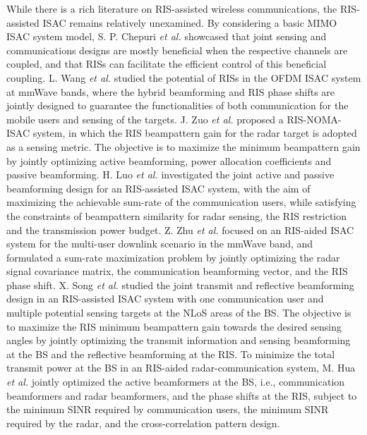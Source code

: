 \documentclass[journal,comsoc]{IEEEtran}
\begin{document}
While there is a rich literature on RIS-assisted wireless communications, the RIS-assisted ISAC remains relatively unexamined. By considering a basic MIMO ISAC system model, S. P. Chepuri \emph{et al.} \cite{ISAC-RIS-2022} showcased that joint sensing and communications designs are mostly beneficial when the respective channels are coupled, and that RISs can facilitate the efficient control of this beneficial coupling. L. Wang \emph{et al.} \cite{JCAS-RIS-mmWave-2022} studied the potential of RISs in the OFDM ISAC system at mmWave bands, where the hybrid beamforming and RIS phase shifts are jointly designed to guarantee the functionalities of both communication for the mobile users and sensing of the targets. J. Zuo \emph{et al.} \cite{NOMA-RIS-ISAC-2022} proposed a RIS-NOMA-ISAC system, in which the RIS beampattern gain for the radar target is adopted as a sensing metric. The objective is to maximize the minimum beampattern gain by jointly optimizing active beamforming, power allocation coefficients and passive beamforming. H. Luo \emph{et al.} \cite{Joint-Beamforming-Design-RIS-ISAC} investigated the joint active and passive beamforming design for an RIS-assisted ISAC system, with the aim of maximizing the achievable sum-rate of the communication users, while satisfying the constraints of beampattern similarity for radar sensing, the RIS restriction and the transmission power budget. Z. Zhu \emph{et al.} \cite{Resource-Allocation-RIS} focused on an RIS-aided ISAC system for the multi-user downlink scenario in the mmWave band, and formulated a sum-rate maximization problem by jointly optimizing the radar signal covariance matrix, the communication beamforming vector, and the RIS phase shift. X. Song \emph{et al.} \cite{Joint-Transmit-Reflective-Beamforming-RIS-ISAC} studied the joint transmit and reflective beamforming design in an RIS-assisted ISAC system with one communication user and multiple potential sensing targets at the NLoS areas of the BS. The objective is to maximize the RIS minimum beampattern gain towards the desired sensing angles by jointly optimizing the transmit information and sensing beamforming at the BS and the reflective beamforming at the RIS. To minimize the total transmit power at the BS in an RIS-aided radar-communication system, M. Hua \emph{et al.} \cite{Joint-Active-Passive-Beamforming-Design-HuaMeng} jointly optimized the active beamformers at the BS, i.e., communication beamformers and radar beamformers, and the phase shifts at the RIS, subject to the minimum SINR required by communication users, the minimum SINR required by the radar, and the cross-correlation pattern design.
\end{document}
